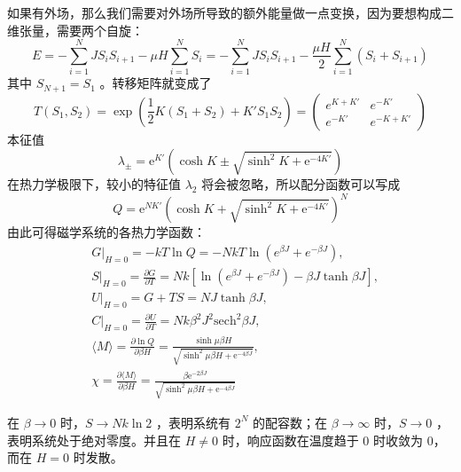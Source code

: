 如果有外场，那么我们需要对外场所导致的额外能量做一点变换，因为要想构成二维张量，需要两个自旋：
\[
    E = -\sum_{i=1}^N JS_i S_{i+1} - \mu H\sum_{i=1}^N S_i = -\sum_{i=1}^N JS_i S_{i+1} - \frac{\mu H}{2} \sum_{i=1}^N (S_i + S_{i+1})
\]
其中 $S_{N+1} = S_1$ 。转移矩阵就变成了
\begin{equation}
    T(S_1,S_2) = \exp(\frac{1}{2}K (S_1+S_2) + K' S_1 S_{2}) = \begin{pmatrix}
        e^{K+K'} & e^{-K'} \\
        e^{-K'} & e^{-K+K'}
    \end{pmatrix} 
\end{equation}
本征值
\begin{equation}
    \lambda_\pm = \mathrm{e}^{ K'}\left(\cosh K \pm \sqrt{\sinh ^2 K + \mathrm{e}^{-4 K'}}\right)
\end{equation}
在热力学极限下，较小的特征值 $\lambda_2$ 将会被忽略，所以配分函数可以写成
\begin{equation}
    Q=\mathrm{e}^{N K'}\left(\cosh K+\sqrt{\sinh ^2 K+\mathrm{e}^{-4 K'}}\right)^N
\end{equation}
由此可得磁学系统的各热力学函数：
\begin{align*}
    &G\bigg|_{H=0} = -kT\ln Q = -NkT \ln (e^{\beta J} + e^{-\beta J}), \\
    &S\bigg|_{H=0} = \frac{\partial G}{\partial T} = Nk\left[\ln (e^{\beta J} + e^{-\beta J}) - \beta J \tanh\beta J\right],\\
    &U\bigg|_{H=0} = G + TS =  NJ \tanh\beta J,\\
    &C\bigg|_{H=0} = \frac{\partial U}{\partial T} = Nk\beta^2 J^2 \mathrm{sech}^2 \beta J,\\
    &\langle M \rangle = \frac{\partial \ln Q}{\partial \beta H} = \frac{\sinh \mu \beta H}{\sqrt{\sinh ^2 \mu \beta H+\mathrm{e}^{-4 \beta J}}},\\
    &\chi = \frac{\partial \langle M \rangle}{\partial \beta H} = \frac{\beta \mathrm{e}^{-2 \beta J}}{\sqrt{\sinh ^2 \mu \beta H+\mathrm{e}^{-4 \beta J}}}
\end{align*}

在 $\beta \rightarrow 0$ 时，$S \rightarrow Nk\ln 2$ ，表明系统有 $2^N$ 的配容数；在 $\beta \rightarrow \infty$ 时，$S \rightarrow 0$ ，表明系统处于绝对零度。并且在 $H \neq 0$ 时，响应函数在温度趋于 $0$ 时收敛为 $0$， 而在 $H = 0$ 时发散。


